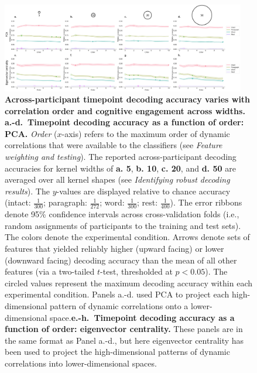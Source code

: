 \documentclass{article}
\begin{document}
\begin{figure}[p!]
\centering
\includegraphics[width=0.95\textwidth]{figs/decode_levels_widths}
\caption{\textbf{Across-participant timepoint decoding accuracy varies with
      correlation order and cognitive engagement across widths.}
    \textbf{a.-d.~Timepoint decoding accuracy as a function of order: PCA.} \textit{Order} ($x$-axis) refers to the maximum order of dynamic
    correlations that were available to the classifiers (see
    \textit{Feature weighting and testing}).  The reported
    across-participant decoding accuracies for kernel widths of \textbf{a. 5},
    \textbf{b. 10}, \textbf{c. 20}, and \textbf{d. 50} are averaged over all
    kernel shapes (see \textit{Identifying robust decoding
      results}).  The $y$-values are displayed relative to chance
    accuracy (intact: $\frac{1}{300}$; paragraph: $\frac{1}{272}$;
    word: $\frac{1}{300}$; rest: $\frac{1}{400}$).  The error ribbons
    denote 95\% confidence intervals across cross-validation folds
    (i.e., random assignments of participants to the training and test
    sets).  The colors denote the experimental condition.  Arrows
    denote sets of features that yielded reliably higher (upward
    facing) or lower (downward facing) decoding accuracy than the mean
    of all other features (via a two-tailed $t$-test, thresholded at
    $p < 0.05$).  The circled values represent
    the maximum decoding accuracy within each experimental condition.  Panels a.-d. used PCA to
    project each high-dimensional pattern of dynamic correlations onto
    a lower-dimensional space.\textbf{e.-h.~Timepoint decoding accuracy as a
      function of order: eigenvector centrality.} These panels are in the
    same format as Panel a.-d., but here eigenvector centrality has been
    used to project the high-dimensional patterns of dynamic
    correlations into lower-dimensional spaces.}
\label{fig:supp_widths}
\end{figure}
\end{document}
